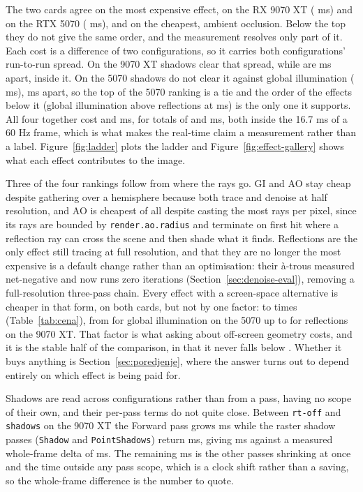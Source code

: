 The two cards agree on the most expensive effect, \perfTopEffectAMD{} on the RX 9070 XT
(\perfEffShadowsAMD{} ms) and \perfTopEffectNV{} on the RTX 5070 (\perfEffShadowsNV{} ms), and on the
cheapest, ambient occlusion. Below the top they do not give the same order, and the measurement
resolves only part of it. Each cost is a difference of two configurations, so it carries both
configurations' run-to-run spread. On the 9070 XT shadows clear that spread, while
\perfUnresolvedAMD{} are \perfUnresolvedGapAMD{} ms apart, inside it. On the 5070 shadows do not
clear it against global illumination (\perfEffGiNV{} ms), \perfUnresolvedGapNV{} ms apart, so the
top of the 5070 ranking is a tie and the order of the effects below it (global illumination above
reflections at \perfEffReflNV{} ms) is the only one it supports. All four together cost \perfFourEffectsAMD{} and
\perfFourEffectsNV{} ms, for totals of \perfTotalAMD{} and \perfTotalNV{} ms, both inside the
16.7 ms of a 60 Hz frame, which is what makes the real-time claim a measurement rather than a label.
Figure~\ref{fig:ladder} plots the ladder and Figure~\ref{fig:effect-gallery} shows what each effect
contributes to the image.

Three of the four rankings follow from where the rays go. GI and AO stay cheap despite gathering over
a hemisphere because both trace and denoise at half resolution, and AO is cheapest of all despite
casting the most rays per pixel, since its rays are bounded by \texttt{render.ao.radius} and
terminate on first hit where a reflection ray can cross the scene and then shade what it finds.
Reflections are the only effect still tracing at full resolution, and that they are no longer the
most expensive is a default change rather than an optimisation: their à-trous measured net-negative
and now runs zero iterations (Section~\ref{sec:denoise-eval}), removing a full-resolution three-pass
chain. Every effect with a screen-space alternative is cheaper in that form, on both cards, but not
by one factor: \perfSsFactorMin{} to \perfSsFactorMax{} times (Table~\ref{tab:cena}), from
\perfSsFactorGiNV{} for global illumination on the 5070 up to \perfSsFactorReflAMD{} for reflections on
the 9070 XT. That factor is what asking about off-screen geometry costs, and it is the stable half of
the comparison, in that it never falls below \perfSsFactorMin{}. Whether it
buys anything is Section~\ref{sec:poredjenje}, where the answer turns out to depend entirely on which
effect is being paid for.

Shadows are read across configurations rather than from a pass, having no scope of their own, and
their per-pass terms do not quite close. Between \texttt{rt-off} and \texttt{shadows} on the 9070 XT
the Forward pass grows \perfFwdGrowAMD{} ms while the raster shadow passes (\texttt{Shadow} and
\texttt{PointShadows}) return \perfShadowMapsAMD{} ms, giving \perfPassNetAMD{} ms against a measured
whole-frame delta of \perfEffShadowsAMD{} ms. The remaining \perfPassResidAMD{} ms is the other
passes shrinking at once and the time outside any pass scope, which is a clock shift rather than a
saving, so the whole-frame difference is the number to quote.

